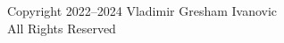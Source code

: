 
\thispagestyle{empty}

\begin{vplace}[100]
  \begin{center}
    \noindent%
    \footnotesize%
    Copyright 2022–2024 Vladimir Gresham Ivanovic\\
    All Rights Reserved\\
  \end{center}
\end{vplace}
 
